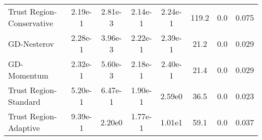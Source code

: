 \documentclass{article}
\begin{document}
\begin{table}[htbp]
{\begin{tabular}{l*{7}{S[table-format=2.2e-1]}}
Trust Region-Conservative & 2.19e-1 & 2.81e-3 & 2.14e-1 & 2.24e-1 & 119.2 & 0.0 & 0.075 \\
GD-Nesterov & 2.28e-1 & 3.96e-3 & 2.22e-1 & 2.39e-1 & 21.2 & 0.0 & 0.029 \\
GD-Momentum & 2.32e-1 & 5.60e-3 & 2.18e-1 & 2.40e-1 & 21.4 & 0.0 & 0.029 \\
Trust Region-Standard & 5.20e-1 & 6.47e-1 & 1.90e-1 & 2.59e0 & 36.5 & 0.0 & 0.023 \\
Trust Region-Adaptive & 9.39e-1 & 2.20e0 & 1.77e-1 & 1.01e1 & 59.1 & 0.0 & 0.037 \\
\bottomrule
\end{tabular}
}
\end{table}
\end{document}
